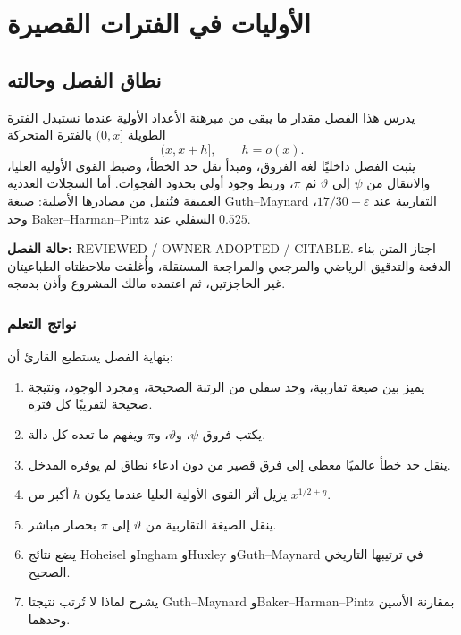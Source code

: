 \chapter{الأوليات في الفترات القصيرة}
\label{ch:primes-short-intervals}

\section*{نطاق الفصل وحالته}

يدرس هذا الفصل مقدار ما يبقى من مبرهنة الأعداد الأولية عندما نستبدل الفترة الطويلة
\((0,x]\) بالفترة المتحركة
\[
(x,x+h],\qquad h=o(x).
\]
يثبت الفصل داخليًا لغة الفروق، ومبدأ نقل حد الخطأ، وضبط القوى الأولية العليا، والانتقال من \(\psi\) إلى \(\vartheta\) ثم \(\pi\)، وربط وجود أولي بحدود الفجوات. أما السجلات العددية العميقة فتُنقل من مصادرها الأصلية: صيغة Guth--Maynard التقاربية عند \(17/30+\varepsilon\)، وحد Baker--Harman--Pintz السفلي عند \(0.525\).

\noindent\textbf{حالة الفصل:} \textenglish{REVIEWED / OWNER-ADOPTED / CITABLE}. اجتاز المتن بناء الدفعة والتدقيق الرياضي والمرجعي والمراجعة المستقلة، وأُغلقت ملاحظتاه الطباعيتان غير الحاجزتين، ثم اعتمده مالك المشروع وأذن بدمجه.

\subsection*{نواتج التعلم}

بنهاية الفصل يستطيع القارئ أن:
\begin{enumerate}
  \item يميز بين صيغة تقاربية، وحد سفلي من الرتبة الصحيحة، ومجرد الوجود، ونتيجة صحيحة لتقريبًا كل فترة.
  \item يكتب فروق \(\psi\)، و\(\vartheta\)، و\(\pi\) ويفهم ما تعده كل دالة.
  \item ينقل حد خطأ عالميًا معطى إلى فرق قصير من دون ادعاء نطاق لم يوفره المدخل.
  \item يزيل أثر القوى الأولية العليا عندما يكون \(h\) أكبر من \(x^{1/2+\eta}\).
  \item ينقل الصيغة التقاربية من \(\vartheta\) إلى \(\pi\) بحصار مباشر.
  \item يضع نتائج Hoheisel وIngham وHuxley وGuth--Maynard في ترتيبها التاريخي الصحيح.
  \item يشرح لماذا لا تُرتب نتيجتا Guth--Maynard وBaker--Harman--Pintz بمقارنة الأسين وحدهما.
\end{enumerate}

